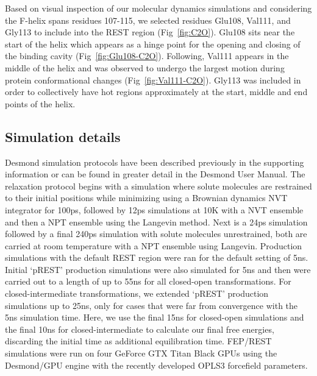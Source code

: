 Based on visual inspection of our molecular dynamics simulations and considering the F-helix spans residues 107-115, we selected residues Glu108, Val111, and Gly113 to include into the REST region (Fig~\ref{fig:C2O}).
Glu108 sits near the start of the helix which appears as a hinge point for the opening and closing of the binding cavity (Fig~\ref{fig:Glu108-C2O}).
Following, Val111 appears in the middle of the helix and was observed to undergo the largest motion during protein conformational changes (Fig~\ref{fig:Val111-C2O}).
Gly113 was included in order to collectively have hot regions approximately at the start, middle and end points of the helix.

\subsection{Simulation details}
Desmond\cite{DESMONDSoftware,DESMONDarticle,DESMONDPaper1,DESMONDPaper2} simulation protocols have been described previously in the supporting information\cite{FEPplus} or can be found in greater detail in the Desmond User Manual\cite{DESMONDManual}.
The relaxation protocol begins with a simulation where solute molecules are restrained to their initial positions while minimizing using a Brownian dynamics NVT integrator for 100ps, followed by 12ps simulations at 10K with a NVT ensemble and then a NPT ensemble using the Langevin method\cite{Langevin}.
Next is a 24ps simulation followed by a final 240ps simulation with solute molecules unrestrained, both are carried at room temperature with a NPT ensemble using Langevin.
Production simulations with the default REST region were ran for the default setting of 5ns.
Initial `pREST' production simulations were also simulated for 5ns and then were carried out to a length of up to 55ns for all closed-open transformations.
For closed-intermediate transformations, we extended `pREST' production simulations up to 25ns, only for cases that were far from convergence with the 5ns simulation time.
Here, we use the final 15ns for closed-open simulations and the final 10ns for closed-intermediate to calculate our final free energies, discarding the initial time as additional equilibration time.
FEP/REST simulations were run on four GeForce GTX Titan Black GPUs using the Desmond/GPU engine with the recently developed OPLS3\cite{OPLS3} forcefield parameters.

